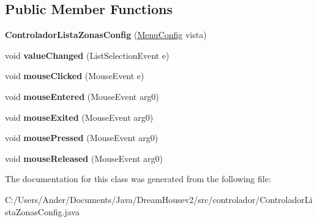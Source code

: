 \subsection*{Public Member Functions}
\begin{DoxyCompactItemize}
\item 
\mbox{\label{classcontrolador_1_1_controlador_lista_zonas_config_acfb911e40132c6189327faa9245c65d1}} 
{\bfseries Controlador\+Lista\+Zonas\+Config} (\mbox{\hyperlink{classvista_1_1_menu_config}{Menu\+Config}} vista)
\item 
\mbox{\label{classcontrolador_1_1_controlador_lista_zonas_config_a287715d558e3480db8c1e8d44dffadc1}} 
void {\bfseries value\+Changed} (List\+Selection\+Event e)
\item 
\mbox{\label{classcontrolador_1_1_controlador_lista_zonas_config_af9773dcae8ecdd67d09d19d35fdedb4d}} 
void {\bfseries mouse\+Clicked} (Mouse\+Event e)
\item 
\mbox{\label{classcontrolador_1_1_controlador_lista_zonas_config_a898fa52ad57e7e6b3d5350815718430d}} 
void {\bfseries mouse\+Entered} (Mouse\+Event arg0)
\item 
\mbox{\label{classcontrolador_1_1_controlador_lista_zonas_config_a423eb2c5ec368f656f37f7b585ac8e23}} 
void {\bfseries mouse\+Exited} (Mouse\+Event arg0)
\item 
\mbox{\label{classcontrolador_1_1_controlador_lista_zonas_config_ad8103d85ca6edb1ac19d3914d4655462}} 
void {\bfseries mouse\+Pressed} (Mouse\+Event arg0)
\item 
\mbox{\label{classcontrolador_1_1_controlador_lista_zonas_config_a34ccbeec87ff186869925224f4877821}} 
void {\bfseries mouse\+Released} (Mouse\+Event arg0)
\end{DoxyCompactItemize}


The documentation for this class was generated from the following file\+:\begin{DoxyCompactItemize}
\item 
C\+:/\+Users/\+Ander/\+Documents/\+Java/\+Dream\+Housev2/src/controlador/Controlador\+Lista\+Zonas\+Config.\+java\end{DoxyCompactItemize}
